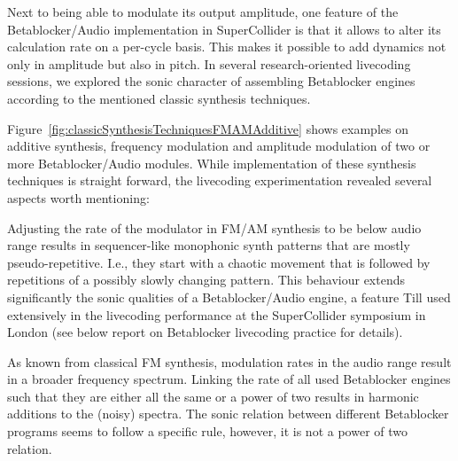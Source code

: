 \documentclass[letterpaper, 12pt]{article}
\begin{document}
Next to being able to modulate its output amplitude, one feature of the Betablocker/Audio implementation in SuperCollider is that it allows to alter its calculation rate on a per-cycle basis.
This makes it possible to add dynamics not only in amplitude but also in pitch.
In several research-oriented livecoding sessions, we explored the sonic character of assembling Betablocker engines according to the mentioned classic synthesis techniques.

Figure~\ref{fig:classicSynthesisTechniquesFMAMAdditive} shows examples on additive synthesis, frequency modulation and amplitude modulation of two or more Betablocker/Audio modules.
While implementation of these synthesis techniques is straight forward, the livecoding experimentation revealed several aspects worth mentioning:

Adjusting the rate of the modulator in FM/AM synthesis to be below audio range results in sequencer-like monophonic synth patterns that are mostly pseudo-repetitive. 
I.e., they start with a chaotic movement that is followed by repetitions of a possibly slowly changing pattern.
This behaviour extends significantly the sonic qualities of a Betablocker/Audio engine, a feature Till used extensively in the livecoding performance at the SuperCollider symposium in London (see below report on Betablocker livecoding practice for details).

As known from classical FM synthesis, modulation rates in the audio range result in a broader frequency spectrum.
Linking the rate of all used Betablocker engines such that they are either all the same or a power of two results in harmonic additions to the (noisy) spectra.
The sonic relation between different Betablocker programs seems to follow a specific rule, however, it is not a power of two relation.



\end{document}
